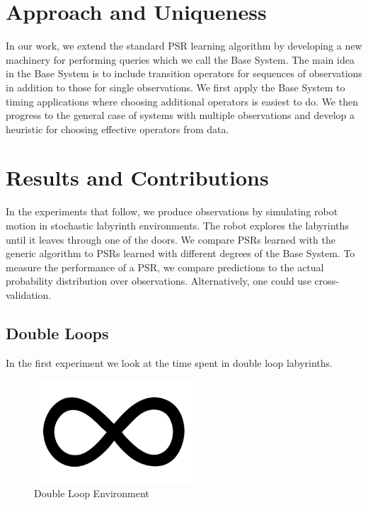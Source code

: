 \documentclass{acm_proc_article-sp}
\begin{document}
\section{Approach and Uniqueness} 

In our work, we extend the standard PSR learning algorithm by developing a new machinery for performing queries which we call the Base System. The main idea in the Base System is to include transition operators for sequences of observations in addition to those for single observations. We first apply the Base System to timing applications where choosing additional operators is easiest to do. We then progress to the general case of systems with multiple observations and develop a heuristic for choosing effective operators from data.

\section{Results and Contributions}

In the experiments that follow, we produce observations by simulating robot motion in stochastic labyrinth environments. The robot explores the labyrinths until it leaves through one of the doors. We compare PSRs learned with the generic algorithm to PSRs learned with different degrees of the Base System. To measure the performance of a PSR, we compare predictions to the actual probability distribution over observations. Alternatively, one could use cross-validation. 

\subsection{Double Loops}

In the first experiment we look at the time spent in double loop labyrinths. 


\begin{figure}[ht!]
\centering
\includegraphics[width=60mm]{lucasplots/doubleLoopImage.png}
\caption{Double Loop Environment\label{overflow}}
\end{figure}
\end{document}
